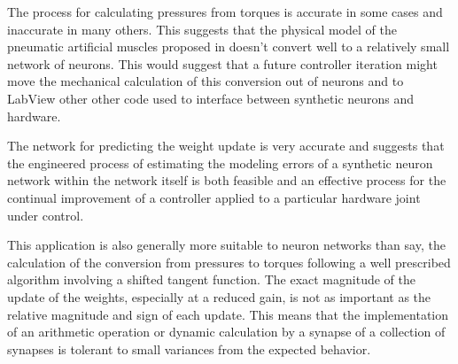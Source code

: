 
The process for calculating pressures from torques is accurate in some
cases and inaccurate in many others. This suggests that the physical
model of the pneumatic artificial muscles proposed in \cite{HuntPMuscles}
doesn't convert well to a relatively small network of neurons. This would
suggest that a future controller iteration might move the mechanical
calculation of this conversion out of neurons and
to LabView other other code used to interface between synthetic neurons and
hardware.


The network for predicting the weight update is very accurate and suggests that
the engineered process of estimating the modeling errors of a synthetic neuron
network within the network itself is both feasible and an effective process for
the continual improvement of a controller applied to a particular hardware
joint under control.

This application is also generally more suitable to neuron networks than say,
the calculation of the conversion from pressures to torques following a well
prescribed algorithm involving a shifted tangent function. The exact magnitude
of the update of the weights, especially at a reduced gain, is not as important
as the relative magnitude and sign of each update. This means that the
implementation of an arithmetic operation or dynamic calculation by a synapse of
a collection of synapses is tolerant to small variances from the expected
behavior.

